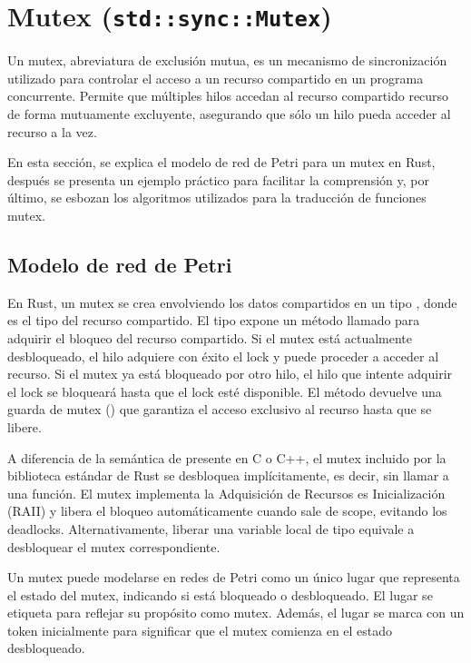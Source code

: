 \section{Mutex (\texttt{std::sync::Mutex})}

Un mutex, abreviatura de exclusión mutua, es un mecanismo de sincronización utilizado para
controlar el acceso a un recurso compartido en un programa concurrente. Permite que múltiples
hilos accedan al recurso compartido recurso de forma mutuamente excluyente,
asegurando que sólo un hilo pueda acceder al recurso a la vez.

En esta sección, se explica el modelo de red de Petri para un mutex en Rust, después se presenta un
ejemplo práctico para facilitar la comprensión y, por último, se esbozan los algoritmos
utilizados para la traducción de funciones mutex.

\subsection{Modelo de red de Petri}

En Rust, un mutex se crea envolviendo los datos compartidos en un tipo ,
donde  es el tipo del recurso compartido.
El tipo  expone un método llamado  para
adquirir el bloqueo del recurso compartido. Si el mutex está actualmente desbloqueado, el
hilo adquiere con éxito el lock y puede proceder a acceder al recurso. Si el mutex ya
está bloqueado por otro hilo, el hilo que intente adquirir el lock se bloqueará hasta que
el lock esté disponible. El método  devuelve una guarda de mutex
() que garantiza el acceso exclusivo al recurso hasta que se libere.

A diferencia de la semántica de  presente en C o C++, el mutex incluido por la
biblioteca estándar de Rust se desbloquea implícitamente, es decir, sin llamar a una función.
El mutex implementa la Adquisición de Recursos es Inicialización (\acrfull{RAII}) y libera el bloqueo
automáticamente cuando sale de scope, evitando los deadlocks. Alternativamente,
liberar una variable local de tipo  equivale a desbloquear el mutex
correspondiente.

Un mutex puede modelarse en redes de Petri como un único lugar que representa el estado del mutex,
indicando si está bloqueado o desbloqueado. El lugar se etiqueta para reflejar su propósito
como mutex. Además, el lugar se marca con un token inicialmente para significar que el mutex
comienza en el estado desbloqueado.

